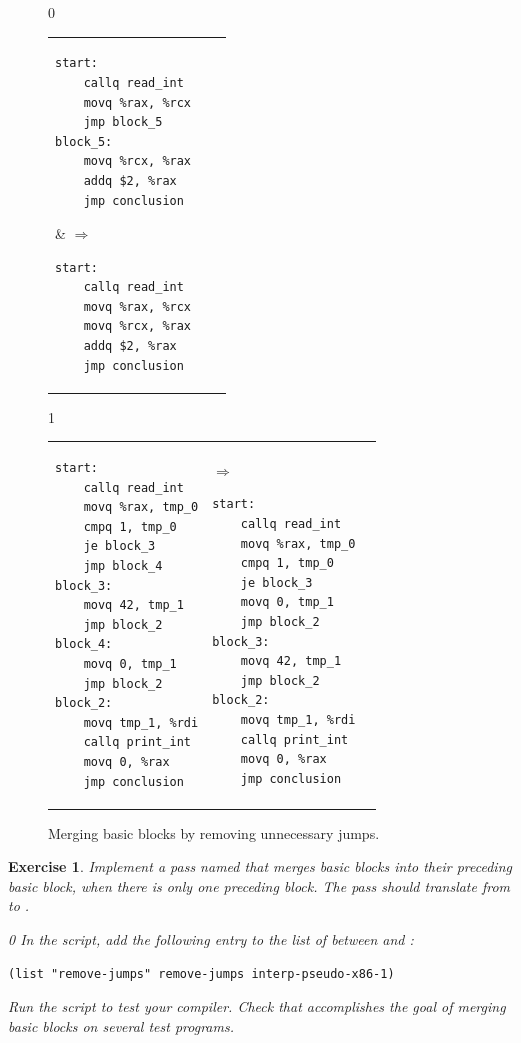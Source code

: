 \documentclass[7x10]{TimesAPriori_MIT}%
\def\racketEd{0}
\def\pythonEd{1}
\def\edition{0}
\newtheorem{exercise}[theorem]{Exercise}
\numberwithin{theorem}{chapter}
\numberwithin{definition}{chapter}
\numberwithin{equation}{chapter}
\begin{document}
\begin{figure}[tbp]
\begin{tcolorbox}[colback=white]
{\if\edition\racketEd        
\begin{tabular}{lll}
\begin{minipage}{0.5\textwidth}
\begin{lstlisting}
start:
    callq read_int
    movq %rax, %rcx
    jmp block_5
block_5:
    movq %rcx, %rax
    addq $2, %rax
    jmp conclusion
\end{lstlisting}
\end{minipage}
&
$\Rightarrow\qquad$
\begin{minipage}{0.4\textwidth}
\begin{lstlisting}
start:
    callq read_int
    movq %rax, %rcx
    movq %rcx, %rax
    addq $2, %rax
    jmp conclusion
\end{lstlisting}
\end{minipage}
\end{tabular}
\fi}
{\if\edition\pythonEd
\begin{tabular}{lll}
\begin{minipage}{0.5\textwidth}
\begin{lstlisting}
start:
	callq read_int
	movq %rax, tmp_0
	cmpq 1, tmp_0
	je block_3
	jmp block_4
block_3:
	movq 42, tmp_1
	jmp block_2
block_4:
	movq 0, tmp_1
	jmp block_2
block_2:
	movq tmp_1, %rdi
	callq print_int
	movq 0, %rax
	jmp conclusion
\end{lstlisting}
\end{minipage}
&
$\Rightarrow\qquad$
\begin{minipage}{0.4\textwidth}
\begin{lstlisting}
start:
	callq read_int
	movq %rax, tmp_0
	cmpq 1, tmp_0
	je block_3
	movq 0, tmp_1
	jmp block_2
block_3:
	movq 42, tmp_1
	jmp block_2
block_2:
	movq tmp_1, %rdi
	callq print_int
	movq 0, %rax
	jmp conclusion
\end{lstlisting}
\end{minipage}
\end{tabular}
\fi}
\end{tcolorbox}

\caption{Merging basic blocks by removing unnecessary jumps.}
\label{fig:remove-jumps}
\end{figure}

\begin{exercise}\normalfont\normalsize
%
Implement a pass named  that merges basic blocks
into their preceding basic block, when there is only one preceding
block. The pass should translate from \LangXIfVar{} to \LangXIfVar{}.
%
{\if\edition\racketEd        
In the  script, add the following entry to the
list of  between 
and :
\begin{lstlisting}
(list "remove-jumps" remove-jumps interp-pseudo-x86-1)
\end{lstlisting}
\fi}
%
Run the script to test your compiler.
%
Check that  accomplishes the goal of merging basic
blocks on several test programs.
\end{exercise}
\end{document}
